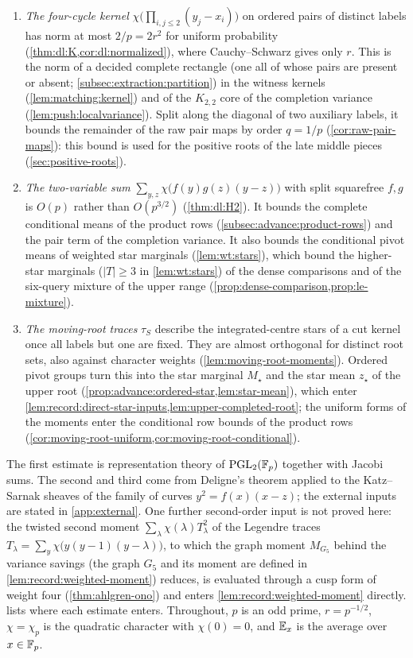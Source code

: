 \begin{enumerate}[label=(\arabic*)]
\item \emph{The four-cycle kernel} $\chi\big(\prod_{i,j\le2}(y_j-x_i)\big)$ on
ordered pairs of distinct labels has norm at most $2/p=2r^2$ for uniform
probability (\cref{thm:dl:K,cor:dl:normalized}), where Cauchy--Schwarz gives
only $r$. This is the norm of a decided complete rectangle (one all of whose pairs are present or absent; \cref{subsec:extraction:partition}) in the witness
kernels (\cref{lem:matching:kernel}) and of the $K_{2,2}$ core of the
completion variance (\cref{lem:push:localvariance}). Split along the diagonal
of two auxiliary labels, it bounds the remainder of the raw pair maps by order
$q=1/p$ (\cref{cor:raw-pair-maps}): this bound is used for the
positive roots of the late middle pieces (\cref{sec:positive-roots}).
\item \emph{The two-variable sum} $\sum_{y,z}\chi\big(f(y)g(z)(y-z)\big)$ with
split squarefree $f,g$ is $O(p)$ rather than $O(p^{3/2})$ (\cref{thm:dl:H2}).
It bounds the complete conditional means of the product rows
(\cref{subsec:advance:product-rows}) and the pair term of the completion
variance. It also bounds the conditional pivot means of weighted star
marginals (\cref{lem:wt:stars}), which bound the higher-star marginals ($|T|\ge3$ in \cref{lem:wt:stars}) of the
dense comparisons and of the six-query mixture of the upper range
(\cref{prop:dense-comparison,prop:le-mixture}).
\item \emph{The moving-root traces} $\tau_S$ describe the integrated-centre
stars of a cut kernel once all labels but one are fixed. They are almost
orthogonal for distinct root sets, also against character weights
(\cref{lem:moving-root-moments}). Ordered pivot groups turn this into the
star marginal $M_\star$ and the star mean $z_\star$ of the upper root
(\cref{prop:advance:ordered-star,lem:star-mean}), which enter
\cref{lem:record:direct-star-inputs,lem:upper-completed-root}; the uniform
forms of the moments enter the conditional row bounds of the product rows
(\cref{cor:moving-root-uniform,cor:moving-root-conditional}).
\end{enumerate}
The first estimate is representation theory of $\mathrm{PGL}_2(\mathbb F_p)$ together
with Jacobi sums. The second and third come from Deligne's theorem applied to
the Katz--Sarnak sheaves of the family of curves $y^2=f(x)(x-z)$; the external
inputs are stated in \cref{app:external}. One further second-order input is
not proved here: the twisted second moment
$\sum_\lambda\chi(\lambda)T_\lambda^2$ of the Legendre traces
$T_\lambda=\sum_y\chi\big(y(y-1)(y-\lambda)\big)$, to which the
graph moment $M_{G_5}$ behind the variance savings (the graph
$G_5$ and its moment are defined in
\cref{lem:record:weighted-moment}) reduces, is evaluated through
a cusp form of
weight four (\cref{thm:ahlgren-ono}) and enters
\cref{lem:record:weighted-moment} directly.
 lists where each estimate enters.
Throughout, $p$ is an odd prime, $r=p^{-1/2}$, $\chi=\chi_p$ is the quadratic
character with $\chi(0)=0$, and $\mathbb E_x$ is the average over $x\in\mathbb F_p$.


